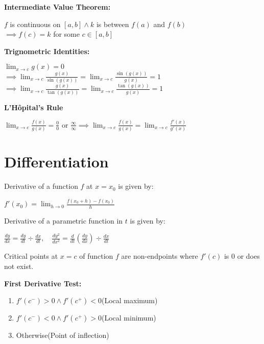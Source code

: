 \documentclass[12pt, a4paper]{article}
\begin{document}
\begin{multicols*}{3}
\textbf{Intermediate Value Theorem:}\\
{\centering
  $f$ is continuous on $[a,b] \land k$ is between $f(a)$ and $f(b)$\\
  $\implies f(c) = k$ for some $c \in [a,b]$
\par}

\textbf{Trignometric Identities:}\\
{\centering
  $\displaystyle\lim_{x\rightarrow c}g(x) = 0$\\
  $\implies \displaystyle \lim_{x\rightarrow c} \frac{g(x)}{\sin(g(x))} = \lim_{x\rightarrow c} \frac{\sin(g(x))}{g(x)} = 1$
  $\implies \displaystyle \lim_{x\rightarrow c} \frac{g(x)}{\tan(g(x))} = \lim_{x\rightarrow c} \frac{\tan(g(x))}{g(x)} = 1$
\par}

\textbf{L'Hôpital's Rule}\\
{\centering
  $\displaystyle \lim_{x\rightarrow c}\frac{f(x)}{g(x)} = \frac{0}{0} \text{ or } \frac{\infty}{\infty}\implies \lim_{x\rightarrow c}\frac{f(x)}{g(x)} = \lim_{x\rightarrow c}\frac{f'(x)}{g'(x)}$
\par}
\colbreak

\section{Differentiation}
Derivative of a function $f$ at $x = x_0$ is given by:\\
{\centering
  $\displaystyle f'(x_0) = \lim_{h\rightarrow0} \frac{f(x_0+h)-f(x_0)}{h}$
\par}
\vspace{-0.5em}
Derivative of a parametric function in $t$ is given by:\\
{\centering
  $\displaystyle \frac{dy}{dx} = \frac{dy}{dt} \div \frac{dx}{dt},\quad \frac{dy^2}{dx^2} = \frac{d}{dt}(\frac{dy}{dx}) \div \frac{dx}{dt}$
\par}

Critical points at $x=c$ of function $f$ are non-endpoints where $f'(c)$ is $0$ or does not exist.

\textbf{First Derivative Test:}
\begin{enumerate}[\roman*.]
  \item $f'(c^-) > 0 \land f'(c^+)<0$\hfill(Local maximum)
  \item $f'(c^-) < 0 \land f'(c^+)>0$\hfill(Local minimum)
  \item Otherwise\hfill(Point of inflection)
\end{enumerate}


\end{multicols*}
\end{document}
